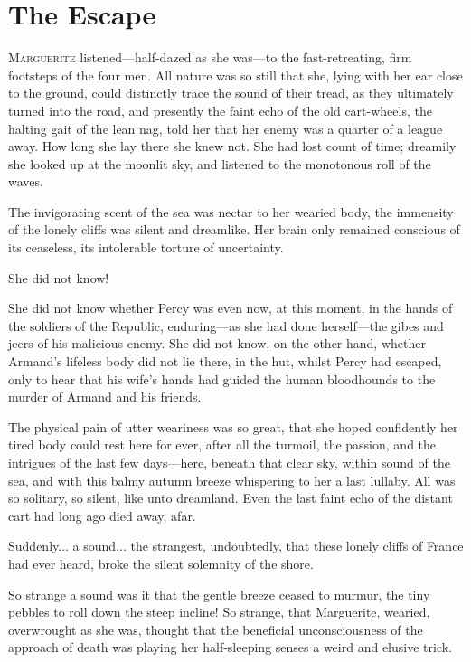 
\chapter{The Escape}
\lettrine[lines=4]{M}{arguerite} listened\allowbreak---\allowbreak half-dazed as she was\allowbreak---\allowbreak to the fast-retreating, firm footsteps of the four men. All nature was so still that she, lying with her ear close to the ground, could distinctly trace the sound of their tread, as they ultimately turned into the road, and presently the faint echo of the old cart-wheels, the halting gait of the lean nag, told her that her enemy was a quarter of a league away. How long she lay there she knew not. She had lost count of time; dreamily she looked up at the moonlit sky, and listened to the monotonous roll of the waves.

The invigorating scent of the sea was nectar to her wearied body, the immensity of the lonely cliffs was silent and dreamlike. Her brain only remained conscious of its ceaseless, its intolerable torture of uncertainty.

She did not know!\longdash


She did not know whether Percy was even now, at this moment, in the hands of the soldiers of the Republic, enduring\allowbreak---\allowbreak as she had done herself\allowbreak---\allowbreak the gibes and jeers of his malicious enemy. She did not know, on the other hand, whether Armand's lifeless body did not lie there, in the hut, whilst Percy had escaped, only to hear that his wife's hands had guided the human bloodhounds to the murder of Armand and his friends.

The physical pain of utter weariness was so great, that she hoped confidently her tired body could rest here for ever, after all the turmoil, the passion, and the intrigues of the last few days\allowbreak---\allowbreak here, beneath that clear sky, within sound of the sea, and with this balmy autumn breeze whispering to her a last lullaby. All was so solitary, so silent, like unto dreamland. Even the last faint echo of the distant cart had long ago died away, afar.

Suddenly... a sound... the strangest, undoubtedly, that these lonely cliffs of France had ever heard, broke the silent solemnity of the shore.

So strange a sound was it that the gentle breeze ceased to murmur, the tiny pebbles to roll down the steep incline! So strange, that Marguerite, wearied, overwrought as she was, thought that the beneficial unconsciousness of the approach of death was playing her half-sleeping senses a weird and elusive trick.

